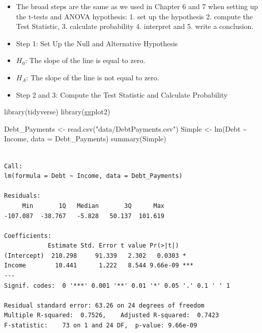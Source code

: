 \documentclass[
  letterpaper,
  DIV=11,
  numbers=noendperiod]{scrreprt}
\newenvironment{Shaded}{\begin{snugshade}}{\end{snugshade}}
\newcommand{\AttributeTok}[1]{\textcolor[rgb]{0.40,0.45,0.13}{#1}}
\newcommand{\FunctionTok}[1]{\textcolor[rgb]{0.28,0.35,0.67}{#1}}
\newcommand{\NormalTok}[1]{\textcolor[rgb]{0.00,0.23,0.31}{#1}}
\newcommand{\OtherTok}[1]{\textcolor[rgb]{0.00,0.23,0.31}{#1}}
\newcommand{\SpecialCharTok}[1]{\textcolor[rgb]{0.37,0.37,0.37}{#1}}
\newcommand{\StringTok}[1]{\textcolor[rgb]{0.13,0.47,0.30}{#1}}
\begin{document}
\begin{itemize}
\item
  The broad steps are the same as we used in Chapter 6 and 7 when
  setting up the t-tests and ANOVA hypothesis: 1. set up the hypothesis
  2. compute the Test Statistic, 3. calculate probability 4. interpret
  and 5. write a conclusion.
\item
  Step 1: Set Up the Null and Alternative Hypothesis
\item
  \(H_0\): The slope of the line is equal to zero.
\item
  \(H_A\): The slope of the line is not equal to zero.
\item
  Step 2 and 3: Compute the Test Statistic and Calculate Probability
\end{itemize}

\begin{Shaded}
\begin{Highlighting}[]
\FunctionTok{library}\NormalTok{(tidyverse)}
\FunctionTok{library}\NormalTok{(ggplot2)}
\end{Highlighting}
\end{Shaded}

\begin{Shaded}
\begin{Highlighting}[]
\NormalTok{Debt\_Payments }\OtherTok{\textless{}{-}} \FunctionTok{read.csv}\NormalTok{(}\StringTok{"data/DebtPayments.csv"}\NormalTok{)}
\NormalTok{Simple }\OtherTok{\textless{}{-}} \FunctionTok{lm}\NormalTok{(Debt }\SpecialCharTok{\textasciitilde{}}\NormalTok{ Income, }\AttributeTok{data =}\NormalTok{ Debt\_Payments)}
\FunctionTok{summary}\NormalTok{(Simple)}
\end{Highlighting}
\end{Shaded}

\begin{verbatim}

Call:
lm(formula = Debt ~ Income, data = Debt_Payments)

Residuals:
     Min       1Q   Median       3Q      Max 
-107.087  -38.767   -5.828   50.137  101.619 

Coefficients:
            Estimate Std. Error t value Pr(>|t|)    
(Intercept)  210.298     91.339   2.302   0.0303 *  
Income        10.441      1.222   8.544 9.66e-09 ***
---
Signif. codes:  0 '***' 0.001 '**' 0.01 '*' 0.05 '.' 0.1 ' ' 1

Residual standard error: 63.26 on 24 degrees of freedom
Multiple R-squared:  0.7526,    Adjusted R-squared:  0.7423 
F-statistic:    73 on 1 and 24 DF,  p-value: 9.66e-09
\end{verbatim}
\end{document}
